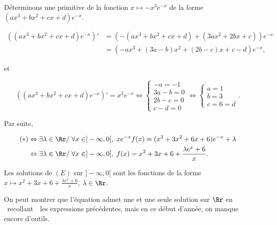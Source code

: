 {{Déterminons une primitive de la fonction $x\mapsto-x^3e^{-x}$ de la forme $(ax^3+bx^2+cx+d)e^{-x}$.

\begin{align*}
((ax^3+bx^2+cx+d)e^{-x})' &= (-(ax^3+bx^2+cx+d)+(3ax^2+2bx+c))e^{-x} \\
&= (-ax^3+(3a-b)x^2+(2b-c)x+c-d)e^{-x},
\end{align*}

et

$$((ax^3+bx^2+cx+d)e^{-x})'=x^3e^{-x}\Leftrightarrow
\left\{
\begin{array}{l}
-a=-1\\
3a-b=0\\
2b-c=0\\
c-d=0
\end{array}
\right.
\Leftrightarrow
\left\{
\begin{array}{l}
a=1\\
b=3\\
c=6=d
\end{array}
\right..$$

Par suite,

\begin{align*}\ensuremath
(*)&\Leftrightarrow\exists\lambda\in\Rr/\;\forall x\in]-\infty,0[,\;xe^{-x}f(x)=(x^3+3x^2+6x+6)e^{-x}+\lambda\\
 &\Leftrightarrow\exists\lambda\in\Rr/\;\forall x\in]-\infty,0[,\;
f(x)=x^2+3x+6+\frac{\lambda e^x+6}{x}.
\end{align*}

Les solutions de $(E)$ sur $]-\infty,0[$ sont les fonctions de la forme $x\mapsto x^2+3x+6+\frac{\lambda e^x+6}{x}$,
$\lambda\in\Rr$.

On peut montrer que l'équation admet une et une seule solution sur $\Rr$ en \og~recollant~\fg~les expressions
précédentes, mais en ce début d'année, on manque encore d'outils.
}
}
